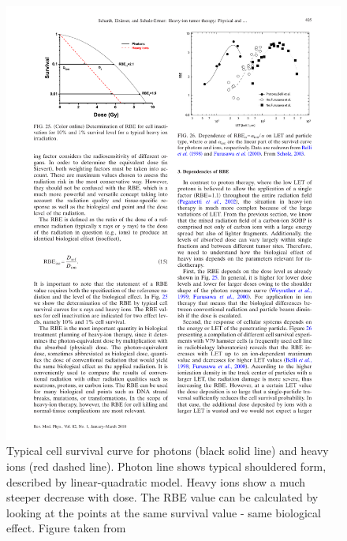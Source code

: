 \documentclass[type=dr, dr=rernat, accentcolor=tud7b,colorbacktitle, bigchapter, openright, twoside, 12pt ]{tudthesis}
\begin{document}
\begin{figure}[H]
\begin{center}
\includegraphics[scale=0.5]{./Images/dose_dependence.pdf}
\caption{Typical cell survival curve for photons (black solid line) and heavy ions (red dashed line). Photon line shows typical shouldered form, described by linear-quadratic model.
Heavy ions show a much steeper decrease with dose. The RBE value can be calculated by looking at the points at the same survival value - same biological effect. Figure taken from \cite{Schardt2010}}
\label{dosedep}
\end{center}
\end{figure}
\end{document}
